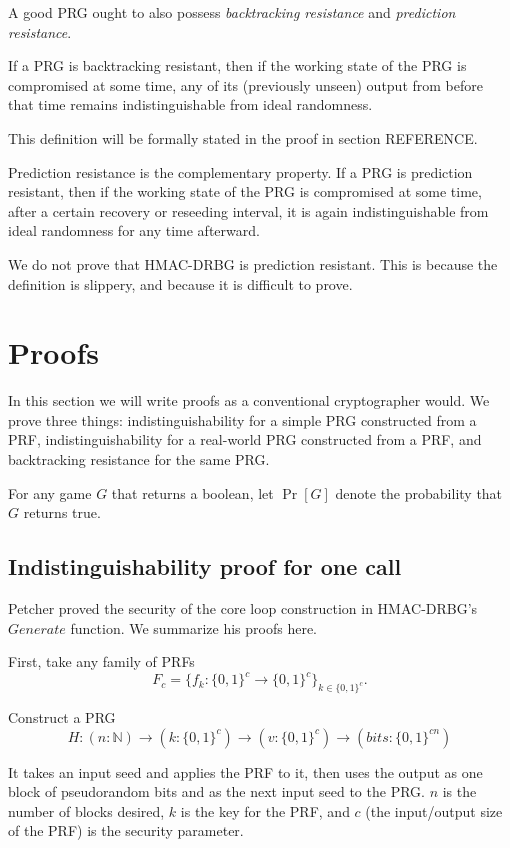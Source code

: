 \documentclass[12pt,lot, lof]{puthesis}
\begin{document}
A good PRG ought to also possess \emph{backtracking resistance} and \emph{prediction resistance}.

If a PRG is backtracking resistant, then if the working state of the PRG is compromised at some time, any of its (previously unseen) output from before that time remains indistinguishable from ideal randomness.

This definition will be formally stated in the proof in section REFERENCE.

Prediction resistance is the complementary property. If a PRG is prediction resistant, then if the working state of the PRG is compromised at some time, after a certain recovery or reseeding interval, it is again indistinguishable from ideal randomness for any time afterward.


We do not prove that HMAC-DRBG is prediction resistant. This is because the definition is slippery, and because it is difficult to prove.

\section{Proofs}

In this section we will write proofs as a conventional cryptographer would. We prove three things: indistinguishability for a simple PRG constructed from a PRF, indistinguishability for a real-world PRG constructed from a PRF, and backtracking resistance for the same PRG.

For any game $G$ that returns a boolean, let $\Pr[G]$ denote the probability that $G$ returns true. 

\subsection{Indistinguishability proof for one call}

Petcher proved the security of the core loop construction in HMAC-DRBG's $Generate$ function. We summarize his proofs here.

First, take any family of PRFs $$F_c = \{f_k : \{0,1\}^c \rightarrow \{0,1\}^c\}_{k \in \{0,1\}^c}.$$

Construct a PRG $$H : (n : \mathbb{N}) \rightarrow (k : \{0,1\}^c) \rightarrow (v : \{0,1\}^c) \rightarrow (bits : \{0,1\}^{cn})$$

It takes an input seed and applies the PRF to it, then uses the output as one block of pseudorandom bits and as the next input seed to the PRG. $n$ is the number of blocks desired, $k$ is the key for the PRF, and $c$ (the input/output size of the PRF) is the security parameter. \\
\end{document}
